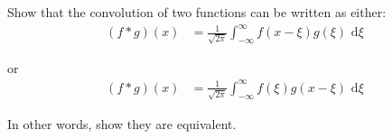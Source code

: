\item Show that the convolution of two functions can be written as either:
%
\begin{align*}
  (f * g) (x) & = \frac{1}{\sqrt{2 \pi}} \int^\infty_{-\infty} f(x - \xi) g(\xi) \text{ d}\xi
\end{align*}

or
%
\begin{align*}
  (f * g) (x) & = \frac{1}{\sqrt{2 \pi}} \int^\infty_{-\infty} f(\xi) g(x - \xi) \text{ d}\xi
\end{align*}

In other words, show they are equivalent.
